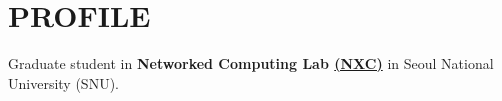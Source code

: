 \section*{PROFILE}

\noindent
\newline
Graduate student in \textbf{Networked Computing Lab \href{https://nxc.snu.ac.kr}{(NXC)}} in Seoul National University (SNU).

